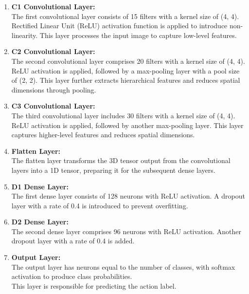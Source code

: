 \documentclass{article}
\begin{document}
\begin{enumerate}
    \item \textbf{C1 Convolutional Layer:} \\
          The first convolutional layer consists of 15 filters with a kernel size of (4, 4). Rectified Linear Unit (ReLU) activation function is applied to introduce non-linearity. This layer processes the input image to capture low-level features.

    \item \textbf{C2 Convolutional Layer:} \\
          The second convolutional layer comprises 20 filters with a kernel size of (4, 4). ReLU activation is applied, followed by a max-pooling layer with a pool size of (2, 2). This layer further extracts hierarchical features and reduces spatial dimensions through pooling.

    \item \textbf{C3 Convolutional Layer:} \\
          The third convolutional layer includes 30 filters with a kernel size of (4, 4). ReLU activation is applied, followed by another max-pooling layer. This layer captures higher-level features and reduces spatial dimensions.

    \item \textbf{Flatten Layer:} \\
          The flatten layer transforms the 3D tensor output from the convolutional layers into a 1D tensor, preparing it for the subsequent dense layers.

    \item \textbf{D1 Dense Layer:} \\
          The first dense layer consists of 128 neurons with ReLU activation. A dropout layer with a rate of 0.4 is introduced to prevent overfitting.

    \item \textbf{D2 Dense Layer:} \\
          The second dense layer comprises 96 neurons with ReLU activation. Another dropout layer with a rate of 0.4 is added.

    \item \textbf{Output Layer:} \\
          The output layer has neurons equal to the number of classes, with softmax activation to produce class probabilities.
          \\
          This layer is responsible for predicting the action label.

\end{enumerate}
\end{document}
